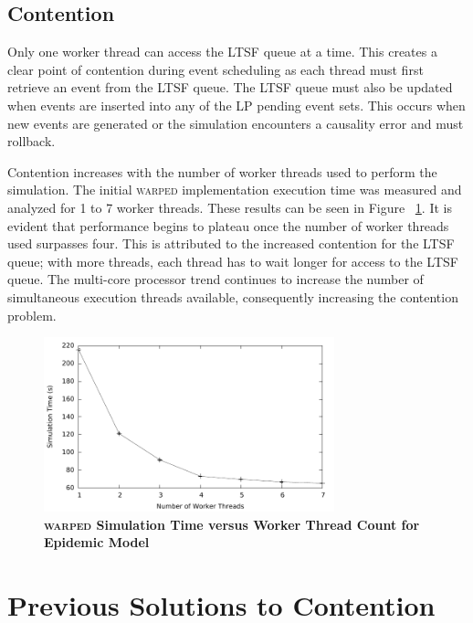 \documentclass[11pt]{book}
\begin{document}
\subsection{Contention}

Only one worker thread can access the LTSF queue at a time.  This creates a clear point of
contention during event scheduling as each thread must first retrieve an event from the
LTSF queue.  The LTSF queue must also be updated when events are inserted into any of the
LP pending event sets.  This occurs when new events are generated or the simulation
encounters a causality error and must rollback.

Contention increases with the number of worker threads used to perform the simulation.
The initial \textsc{warped} implementation execution time was measured and analyzed for 1 to 7
worker threads.  These results can be seen in Figure ~\ref{fig:notsx_profile}.  It is
evident that performance begins to plateau once the number of worker threads used
surpasses four.  This is attributed to the increased contention for the LTSF queue; with
more threads, each thread has to wait longer for access to the LTSF queue.  The multi-core
processor trend continues to increase the number of simultaneous execution threads
available, consequently increasing the contention problem.

\begin{figure}[H]
    \centering
    \graphicspath{ {./figures/} }
    \includegraphics[width=0.75\textwidth,keepaspectratio]{notsx_profile}
    \caption{\textbf{\textsc{warped} Simulation Time versus Worker Thread Count for
    Epidemic Model}}
    \label{fig:notsx_profile}
\end{figure}

\section{Previous Solutions to Contention}
\end{document}
